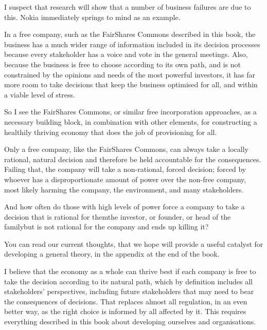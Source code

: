 I suspect that research will show that a number of business failures are due to this. Nokia immediately springs to mind as an example.






In a free company, such as the FairShares Commons  described in this book, the business has a much wider range of information included in its decision processes because every stakeholder has a voice and vote in the general meetings. Also, because the business is free to choose according to its own path, and is not constrained by the opinions and needs of the most powerful investors, it has far more room to take decisions that keep the business optimised for all, and within a viable level of stress.


So I see the FairShares Commons, or similar free incorporation approaches, as a necessary building block, in combination with other elements, for constructing a healthily thriving economy that does the job of provisioning for all.


Only a free company, like the FairShares Commons, can always take a locally rational, natural decision and therefore be held accountable for the consequences. Failing that, the company will take a non-rational, forced decision; forced by whoever has a disproportionate amount of power over the non-free company, most likely harming the company, the environment, and many stakeholders. 


And how often do those with high levels of power force a company to take a decision that is rational for them\textemdash the investor, or founder, or head of the family\textemdash but is not rational for the company and ends up killing it?


You can read our current thoughts, that we hope will provide a useful catalyst for developing a general theory, in the appendix at the end of the book.


I believe that the economy as a whole can thrive best if each company is free to take the decision according to its natural path, which by definition includes all stakeholders’ perspectives, including future stakeholders that may need to bear the consequences of decisions. That replaces almost all regulation, in an even better way, as the right choice is informed by all affected by it. This requires everything described in this book about developing ourselves and organisations.